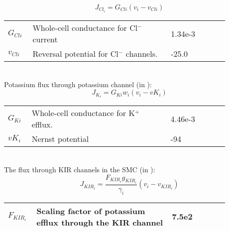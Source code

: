 \begin{equation} \label{eq:JCli}
J_{Cl_{i}} = G_{Cli} \left(  v_{i} - v_{Cli}  \right) 
\end{equation}
%
\begin{table}[h!]
\centering
\begin{tabular}{| p{0.09\linewidth} | >{\footnotesize} p{0.57\linewidth} | >{\footnotesize} p{0.2\linewidth} | >{\footnotesize} p{0.02\linewidth} |}
\arrayrulecolor{lightgrey}\hline
$G_{Cli}$      			& Whole-cell conductance for Cl$^{-}$ current		& 1.34e-3 \uMpmVs	&\cite{Koenigsberger2006} \\
$v_{Cli}$      			& Reversal potential for Cl$^{-}$ channels.			& -25.0 \mV			&\cite{Koenigsberger2006} \\
\hline
\end{tabular}
\label{tab:JCli}
\end{table}
\\
%
Potassium flux through potassium channel (in \uMs):
\begin{equation} \label{eq:JKi}
J_{K_{i}}= G_{Ki} w_{i} \left(  v_{i} - vK_i  \right) 
\end{equation}
%
\begin{table}[h!]
\centering
\begin{tabular}{| p{0.09\linewidth} | >{\footnotesize} p{0.57\linewidth} | >{\footnotesize} p{0.2\linewidth} | >{\footnotesize} p{0.02\linewidth} |}
\arrayrulecolor{lightgrey}\hline
$G_{Ki}$      			& Whole-cell conductance for K$^{+}$ efflux.			& 4.46e-3 \uMpmVs	&\cite{Koenigsberger2005} \\
$vK_i$      			& Nernst potential										& -94 \mV	&\cite{Koenigsberger2005} \\
\hline
\end{tabular}
\label{tab:JKi}
\end{table}
\\
The flux through KIR channels in the SMC (in \uMs): 
\begin{equation} \label{eq:JKIRi}
J_{KIR_{i}} =  \frac{F_{KIR_{i}} g_{KIR_{i}}}{\gamma_{i}}( v_{i} - v_{KIR_{i}})
\end{equation}
%
\begin{table}[h!]
\centering
\begin{tabular}{| p{0.09\linewidth} | >{\footnotesize} p{0.57\linewidth} | >{\footnotesize} p{0.2\linewidth} | >{\footnotesize} p{0.02\linewidth} |}
\arrayrulecolor{lightgrey}\hline
$ F_{KIR_{i}} $ & Scaling factor of potassium efflux through the KIR channel & 7.5e2 & \cite{LoesEvert} \\
\hline
\end{tabular}
\label{tab:JKIRi}
\end{table}
